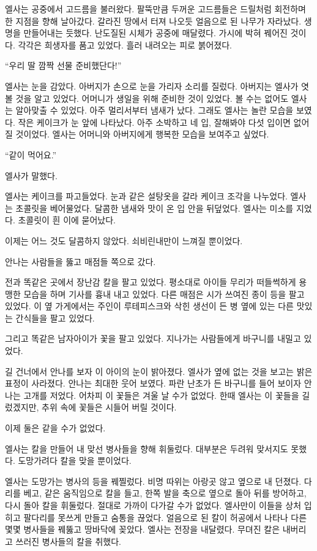 엘사는 공중에서 고드름을 불러왔다. 팔뚝만큼 두꺼운 고드름들은 드릴처럼 회전하며 한 지점을 향해 날아갔다. 갈라진 땅에서 터져 나오듯 얼음으로 된 나무가 자라났다. 생명을 만들어내는 듯했다. 난도질된 시체가 공중에 매달렸다. 가시에 박혀 꿰어진 것이다. 각각은 희생자를 품고 있었다. 흘러 내려오는 피로 붉어졌다.  %

``우리 딸 깜짝 선물 준비했단다!''

엘사는 눈을 감았다. 아버지가 손으로 눈을 가리자 소리를 질렀다. 아버지는 엘사가 엿볼 것을 알고 있었다. 어머니가 생일을 위해 준비한 것이 있었다. 볼 수는 없어도 엘사는 알아맞출 수 있었다. 아주 멀리서부터 냄새가 났다. 그래도 엘사는 놀란 모습을 보였다. 작은 케이크가 눈 앞에 나타났다. 아주 소박하고 네 입, 잘해봐야 다섯 입이면 없어질 것이었다. 엘사는 어머니와 아버지에게 행복한 모습을 보여주고 싶었다.

``같이 먹어요.''

엘사가 말했다.

엘사는 케이크를 파고들었다. 눈과 같은 설탕옷을 갈라 케이크 조각을 나누었다. 엘사는 초콜릿을 베어물었다. 달콤한 냄새와 맛이 온 입 안을 뒤덮었다. 엘사는 미소를 지었다. 초콜릿이 흰 이에 묻어났다.

이제는 어느 것도 달콤하지 않았다. 쇠비린내만이 느껴질 뿐이었다.

\textbreak

안나는 사람들을 뚫고 매점들 쪽으로 갔다.

전과 똑같은 곳에서 장난감 칼을 팔고 있었다. 평소대로 아이들 무리가 떠들썩하게 용맹한 모습을 하며 기사를 흉내 내고 있었다. 다른 매점은 시가 쓰여진 종이 등을 팔고 있었다. 이 옆 가게에서는 주인이 루테피스크와 삭힌 생선이 든 병 옆에 있는 다른 맛있는 간식들을 팔고 있었다.

그리고 똑같은 남자아이가 꽃을 팔고 있었다. 지나가는 사람들에게 바구니를 내밀고 있었다.

길 건너에서 안나를 보자 이 아이의 눈이 밝아졌다. 엘사가 옆에 없는 것을 보고는 밝은 표정이 사라졌다. 안나는 최대한 웃어 보였다. 파란 난초가 든 바구니를 들어 보이자 안나는 고개를 저었다. 어차피 이 꽃들은 겨울 날 수가 없었다. 한때 엘사는 이 꽃들을 길렀겠지만, 추위 속에 꽃들은 시들어 버릴 것이다.

이제 둘은 같을 수가 없었다.

\textbreak

엘사는 칼을 만들어 내 맞선 병사들을 향해 휘둘렀다. 대부분은 두려워 맞서지도 못했다. 도망가려다 칼을 맞을 뿐이었다.

엘사는 도망가는 병사의 등을 꿰찔렀다. 비명 따위는 아랑곳 않고 옆으로 내 던졌다. 다리를 베고, 같은 움직임으로 칼을 들고, 한쪽 발을 축으로 옆으로 돌아 뒤를 방어하고, 다시 돌아 칼을 휘둘렀다. 절대로 가까이 다가갈 수가 없었다. 엘사만이 이들을 상처 입히고 팔다리를 못쓰게 만들고 숨통을 끊었다. 얼음으로 된 칼이 허공에서 나타나 다른 몇몇 병사들을 꿰뚫고 땅바닥에 꽂았다. 엘사는 전장을 내달렸다. 무뎌진 칼은 내버리고 쓰러진 병사들의 칼을 취했다.


